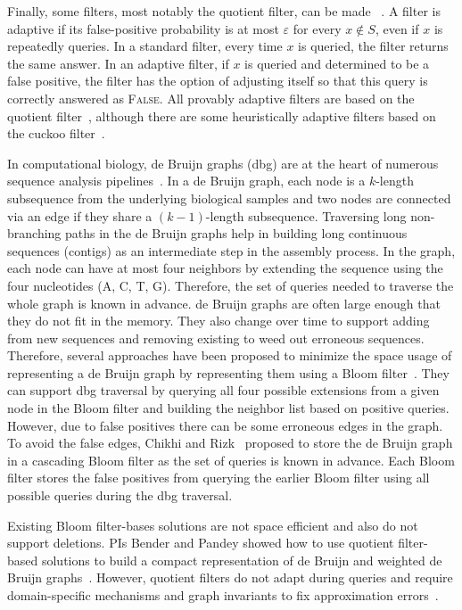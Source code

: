 Finally, some filters, most notably the quotient filter, can be made ~\cite{BenderFaGo18}.  A filter is adaptive if its false-positive probability is at most $\varepsilon$ for every $x\notin S$, even if $x$ is repeatedly queries.  In a standard filter, every time $x$ is queried, the filter returns the same answer.  In an adaptive filter, if $x$ is queried and determined to be a false positive, the filter has the option of adjusting itself so that this query is correctly answered as \textsc{False}.  All provably adaptive filters are based on the quotient filter~\cite{BenderFaGo18,Lee21}, although there are some heuristically adaptive filters based on the cuckoo filter~\cite{Mitzenmacher2020}.

  In computational biology, de Bruijn graphs (dbg) are at the heart of numerous sequence analysis pipelines~\cite{PandeyBJP17a, PandeyBJP17b}. In a de Bruijn graph, each node is a $k$-length subsequence from the underlying biological samples and two nodes are connected via an edge if they share a $(k-1)$-length subsequence.  Traversing long non-branching paths in the de Bruijn graphs help in building long continuous sequences (contigs) as an intermediate step in the assembly process.
In the graph, each node can have at most four neighbors by extending the sequence using the four nucleotides (A, C, T, G). Therefore, the set of queries needed to traverse the whole graph is known in advance.
%
de Bruijn graphs are often large enough that they do not fit in the memory. They also change over time to support adding \kmers from new sequences and removing existing \kmers to weed out erroneous sequences.
Therefore, several approaches have been proposed to minimize the space usage of representing a de Bruijn graph by representing them using a Bloom filter~\cite{chikhi2013space}. They can support dbg traversal by querying all four possible extensions from a given node in the Bloom filter and building the neighbor list based on positive queries. However, due to false positives there can be some erroneous edges in the graph.
To avoid the false edges, Chikhi and Rizk~\cite{chikhi2013space} proposed to store the de Bruijn graph in a cascading Bloom filter as the set of queries is known in advance. Each Bloom filter stores the false positives from querying the earlier Bloom filter using all possible queries during the dbg traversal.

Existing Bloom filter-bases solutions are not space efficient and also do not support deletions. PIs Bender and Pandey showed how to use quotient filter-based solutions to build a compact representation of de Bruijn and weighted de Bruijn graphs~\cite{PandeyBJP17b}. However, quotient filters do not adapt during queries and require domain-specific mechanisms and graph invariants to fix approximation errors~\cite{PandeyBJP17b}.

